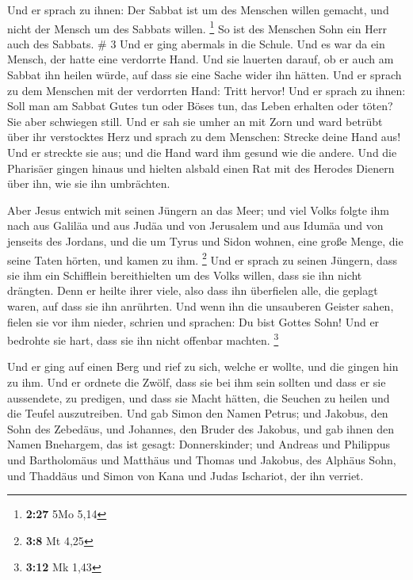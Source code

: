  Und er sprach zu ihnen: Der Sabbat ist um des Menschen
willen gemacht, und nicht der Mensch um des Sabbats willen. \footnote{\textbf{2:27}
  5Mo 5,14}  So ist des Menschen Sohn ein Herr auch des
Sabbats. \# 3  Und er ging abermals in die Schule. Und es
war da ein Mensch, der hatte eine verdorrte Hand.  Und sie
lauerten darauf, ob er auch am Sabbat ihn heilen würde, auf dass sie
eine Sache wider ihn hätten.  Und er sprach zu dem
Menschen mit der verdorrten Hand: Tritt hervor!  Und er
sprach zu ihnen: Soll man am Sabbat Gutes tun oder Böses tun, das Leben
erhalten oder töten? Sie aber schwiegen still.  Und er sah
sie umher an mit Zorn und ward betrübt über ihr verstocktes Herz und
sprach zu dem Menschen: Strecke deine Hand aus! Und er streckte sie aus;
und die Hand ward ihm gesund wie die andere.  Und die
Pharisäer gingen hinaus und hielten alsbald einen Rat mit des Herodes
Dienern über ihn, wie sie ihn umbrächten.

 Aber Jesus entwich mit seinen Jüngern an das Meer; und
viel Volks folgte ihm nach aus Galiläa und aus Judäa  und
von Jerusalem und aus Idumäa und von jenseits des Jordans, und die um
Tyrus und Sidon wohnen, eine große Menge, die seine Taten hörten, und
kamen zu ihm. \footnote{\textbf{3:8} Mt 4,25}  Und er
sprach zu seinen Jüngern, dass sie ihm ein Schifflein bereithielten um
des Volks willen, dass sie ihn nicht drängten.  Denn er
heilte ihrer viele, also dass ihn überfielen alle, die geplagt waren,
auf dass sie ihn anrührten.  Und wenn ihn die unsauberen
Geister sahen, fielen sie vor ihm nieder, schrien und sprachen: Du bist
Gottes Sohn!  Und er bedrohte sie hart, dass sie ihn
nicht offenbar machten. \footnote{\textbf{3:12} Mk 1,43}

 Und er ging auf einen Berg und rief zu sich, welche er
wollte, und die gingen hin zu ihm.  Und er ordnete die
Zwölf, dass sie bei ihm sein sollten und dass er sie aussendete, zu
predigen,  und dass sie Macht hätten, die Seuchen zu
heilen und die Teufel auszutreiben.  Und gab Simon den
Namen Petrus;  und Jakobus, den Sohn des Zebedäus, und
Johannes, den Bruder des Jakobus, und gab ihnen den Namen Bnehargem, das
ist gesagt: Donnerskinder;  und Andreas und Philippus und
Bartholomäus und Matthäus und Thomas und Jakobus, des Alphäus Sohn, und
Thaddäus und Simon von Kana  und Judas Ischariot, der ihn
verriet.

